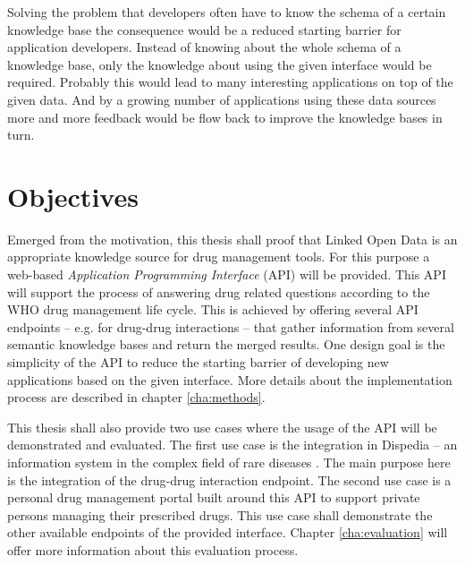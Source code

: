Solving the problem that developers often have to know the schema of a certain knowledge base the consequence would be a reduced starting barrier for application developers.
Instead of knowing about the whole schema of a knowledge base, only the knowledge about using the given interface would be required.
Probably this would lead to many interesting applications on top of the given data.
And by a growing number of applications using these data sources more and more feedback would be flow back to improve the knowledge bases in turn.


\section{Objectives}
\label{sec:objectives}

Emerged from the motivation, this thesis shall proof that Linked Open Data is an appropriate knowledge source for drug management tools.
For this purpose a web-based \textit{Application Programming Interface} (API) will be provided.
This API will support the process of answering drug related questions according to the WHO drug management life cycle.
This is achieved by offering several API endpoints -- e.g. for drug-drug interactions -- that gather information from several semantic knowledge bases and return the merged results.
One design goal is the simplicity of the API to reduce the starting barrier of developing new applications based on the given interface.
More details about the implementation process are described in chapter \ref{cha:methods}.

This thesis shall also provide two use cases where the usage of the API will be demonstrated and evaluated.
The first use case is the integration in Dispedia -- an information system in the complex field of rare diseases \cite{elze2013dispedia}.
The main purpose here is the integration of the drug-drug interaction endpoint.
The second use case is a personal drug management portal built around this API to support private persons managing their prescribed drugs.
This use case shall demonstrate the other available endpoints of the provided interface.
Chapter \ref{cha:evaluation} will offer more information about this evaluation process.

